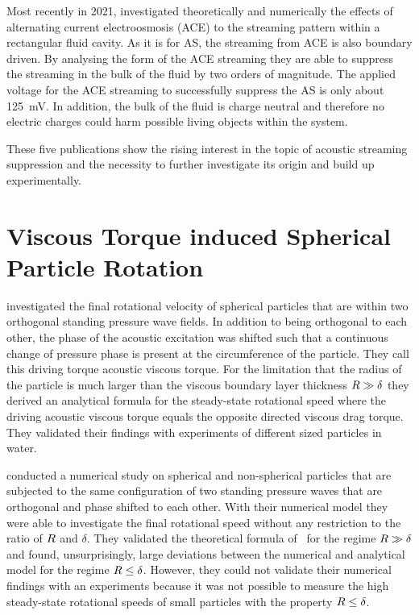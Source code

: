Most recently in 2021,  investigated theoretically and 
numerically the effects of alternating current electroosmosis (ACE) to the 
streaming pattern within a rectangular fluid cavity. As it is for AS, the 
streaming from ACE is also boundary driven. By analysing the form of the ACE 
streaming they are able to suppress the streaming in the bulk of the fluid by 
two orders of magnitude. The applied voltage for the ACE streaming to 
successfully suppress the AS is only about \SI{125}{\milli\volt}. In addition, 
the bulk of the fluid is charge neutral and therefore no electric charges could 
harm possible living objects within the system.

These five publications show the rising interest in the topic of acoustic 
streaming suppression and the necessity to further investigate its origin and 
build up experimentally.

\section{Viscous Torque induced Spherical Particle Rotation}

 investigated the final rotational velocity of spherical 
particles that are within two orthogonal standing pressure wave fields. In 
addition to being orthogonal to each other, the phase of the acoustic 
excitation was shifted such that a continuous change of pressure phase is 
present at the circumference of the particle. They call this driving torque 
acoustic viscous torque. For the limitation that the radius of the particle is 
much larger than the viscous boundary layer thickness $R\gg\delta$ they 
derived an analytical formula for the steady-state rotational speed where the 
driving acoustic viscous torque equals the opposite directed viscous drag 
torque. They validated their findings with experiments of different sized 
particles in water.

 conducted a numerical study on spherical and non-spherical 
particles that are subjected to the same configuration of two standing pressure 
waves that are orthogonal and phase shifted to each other. With their numerical 
model they were able to investigate the final rotational speed without any 
restriction to the ratio of $R$ and $\delta$. They validated the theoretical 
formula of~\cite{Lamprecht2015} for the regime $R\gg\delta$ and found, 
unsurprisingly, large deviations between the numerical and analytical model for 
the regime $R\leq\delta$. However, they could not validate their numerical 
findings with an experiments because it was not possible to measure the high 
steady-state rotational speeds of small particles with the property 
$R\leq\delta$.


